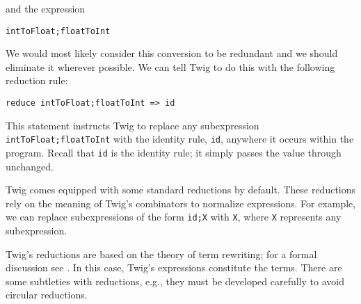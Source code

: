\noindent and the expression

\begin{verbatim}
intToFloat;floatToInt
\end{verbatim}

We would most likely consider this conversion to be redundant and
we should eliminate it wherever possible. We can tell Twig to do
this with the following reduction rule:

\begin{verbatim}
reduce intToFloat;floatToInt => id
\end{verbatim}

This statement instructs Twig to replace any subexpression
\texttt{intToFloat;floatToInt} with the identity rule,
\texttt{id}, anywhere it occurs within the program. Recall that
\texttt{id} is the identity rule; it simply passes the value
through unchanged.

Twig comes equipped with some standard reductions by default.
These reductions rely on the meaning of Twig's combinators to
normalize expressions. For example, we can replace subexpressions
of the form \texttt{id;X} with \texttt{X}, where \texttt{X}
represents any subexpression.

Twig's reductions are based on the theory of term rewriting; for a
formal discussion see \cite{baader98rewriting}. In this case,
Twig's expressions constitute the terms. There are some subtleties
with reductions, e.g., they must be developed carefully to avoid
circular reductions.
